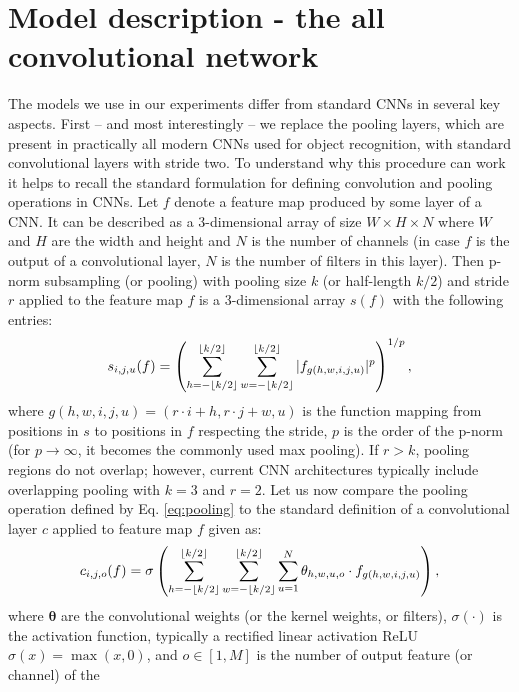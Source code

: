 \documentclass{article} %
\DeclarePairedDelimiter\floor{\lfloor}{\rfloor}
\begin{document}
\section{Model description - the all convolutional network}
\label{sect:model}
The models we use in our experiments differ from standard CNNs in
several key aspects. First -- and most interestingly -- we replace
the pooling layers, which are present in practically all modern CNNs used for object
recognition, with standard convolutional layers with stride two. 
 To understand why this procedure can work it helps to recall the standard
 formulation for defining convolution and pooling operations in
 CNNs. 
Let $f$ denote a feature map produced by some layer of a CNN. It can be described as
 a 3-dimensional array of size $W \times H \times N$ where $W$ and $H$ are the width and
 height and $N$ is the number of channels (in case $f$ is the output of a convolutional layer, $N$ is the number of filters in this layer). 
 Then p-norm subsampling (or pooling) 
 with pooling size $k$ (or half-length $k/2$) and stride $r$ applied to the feature map $f$ is a 3-dimensional array $s(f)$ with the following entries:   
 \begin{equation}
   s_{i,j,u}(f) = \left (\sum_{h=-\floor{k/2}}^{\floor{k/2}} \sum_{w=-\floor{k/2}}^{\floor{k/2}}
     |f_{g(h,w,i,j,u)}|^p \right )^{1/p},
  \label{eq:pooling}
 \end{equation}
 where $g(h,w,i,j,u) = (r \cdot i + h, r \cdot j + w, u)$ is the function mapping from
 positions in $s$ to positions in $f$ respecting the stride, $p$ is
 the order of the p-norm (for $p \rightarrow \infty$, it becomes the commonly used max pooling). If
 $r > k$, pooling regions do not overlap; however, current CNN architectures typically include overlapping pooling with $k = 3$ and $r = 2$.
 Let us now compare the pooling operation defined by
 Eq. \ref{eq:pooling} to the standard definition of a
 convolutional layer $c$ applied to feature map $f$ given as:
 \begin{equation}
   c_{i,j,o}(f) = \sigma \left ( \sum_{h=-\floor{k/2}}^{\floor{k/2}}
     \sum_{w=-\floor{k/2}}^{\floor{k/2}} \sum_{u=1}^{N}
     \theta_{h,w,u,o} \cdot f_{g(h,w,i,j,u)} \right ),
  \label{eq:convolition}
 \end{equation}
 where $\mathbf{\theta}$ are the convolutional weights (or the kernel weights, or filters),
 $\sigma(\cdot)$ is the activation function, typically a rectified linear activation ReLU $\sigma(x) =
 \max(x, 0)$, and $o \in [1,M]$ is the number of output feature (or channel) of the
\end{document}

